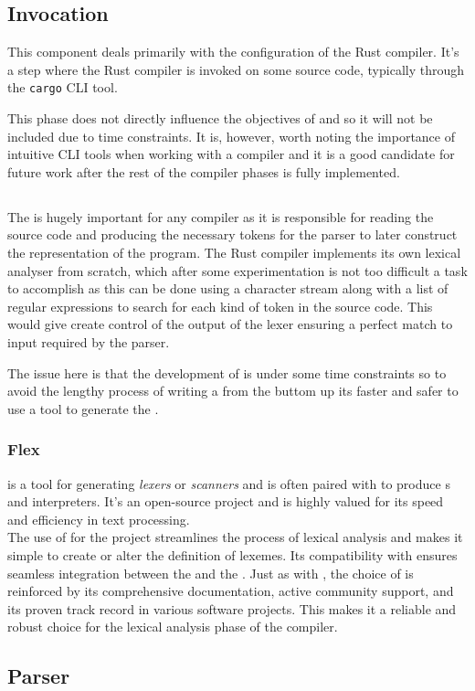 \subsection{Invocation}

This component deals primarily with the configuration of the Rust compiler. It's a
step where the Rust compiler is invoked on some source code, typically through the
\texttt{cargo} CLI tool\cite{RUST_COMPILER}. 

This phase does not directly influence the objectives of \lang{} and so it will not
be included due to time constraints. It is, however, worth noting the importance of
intuitive CLI tools when working with a compiler and it is a good candidate for
future work after the rest of the compiler phases is fully implemented.

\subsection{\lexer{}}

The \lexer{} is hugely important for any compiler as it is responsible for
reading the source code and producing the necessary tokens for the parser to later
construct the \ast{} representation of the program. The Rust compiler implements its
own lexical analyser from scratch, which after some experimentation is not too
difficult a task to accomplish as this can be done using a character stream along
with a list of regular expressions to search for each kind of token in the source
code. This would give create control of the output of the lexer ensuring a perfect
match to input required by the parser. 

The issue here is that the development of \lang{} is under some time constraints so
to avoid the lengthy process of writing a \lexer{} from the buttom up its faster and
safer to use a tool to generate the \lexer{}.

\subsubsection{Flex}

\lexerGen{} is a tool for generating \textit{lexers} or \textit{scanners} and is
often paired with \parserGen{} to produce \parser{}s and interpreters. It's an
open-source project and is highly valued for its speed and efficiency in text
processing. \\

The use of \lexerGen{} for the \lang{} project streamlines the process of lexical
analysis and makes it simple to create or alter the definition of lexemes. Its
compatibility with \parserGen{} ensures seamless integration between the \lexer{} and
the \parser. Just as with \parserGen, the choice of \lexerGen{} is reinforced by its
comprehensive documentation, active community support, and its proven track record in
various software projects. This makes it a reliable and robust choice for the lexical
analysis phase of the \lang{} compiler.

\subsection{Parser}


\newpage
